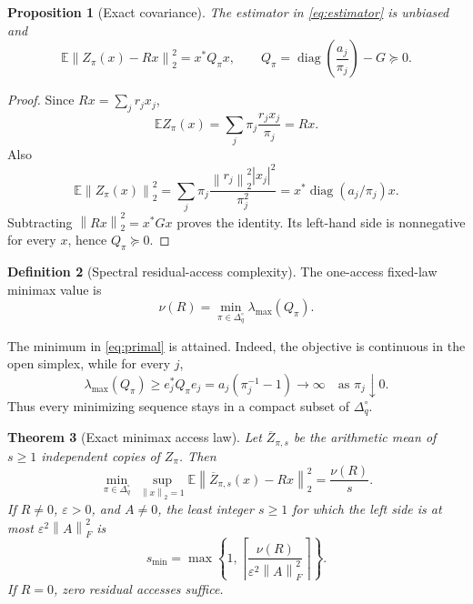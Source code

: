\documentclass[11pt]{article}
\newtheorem{theorem}{Theorem}[section]
\newtheorem{proposition}[theorem]{Proposition}
\theoremstyle{definition}
\newtheorem{definition}[theorem]{Definition}
\newcommand{\diag}{\operatorname{diag}}
\newcommand{\E}{\mathbb E}
\newcommand{\norm}[1]{\left\lVert #1\right\rVert}
\begin{document}
\begin{proposition}[Exact covariance]
\label{prop:covariance}
The estimator in \eqref{eq:estimator} is unbiased and
\begin{equation}
  \E\norm{Z_\pi(x)-Rx}_2^2=x^*Q_\pi x,
  \qquad
  Q_\pi=\diag\!\left(\frac{a_j}{\pi_j}\right)-G\succeq0.
  \label{eq:covariance}
\end{equation}
\end{proposition}

\begin{proof}
Since $Rx=\sum_jr_jx_j$,
\[
  \E Z_\pi(x)=\sum_j\pi_j\frac{r_jx_j}{\pi_j}=Rx.
\]
Also
\[
  \E\norm{Z_\pi(x)}_2^2
  =\sum_j\pi_j\frac{\norm{r_j}_2^2|x_j|^2}{\pi_j^2}
  =x^*\diag(a_j/\pi_j)x.
\]
Subtracting $\norm{Rx}_2^2=x^*Gx$ proves the identity.  Its left-hand side is nonnegative for
every $x$, hence $Q_\pi\succeq0$.
\end{proof}

\begin{definition}[Spectral residual-access complexity]
\label{def:nu}
The one-access fixed-law minimax value is
\begin{equation}
  \nu(R)=\min_{\pi\in\Delta_q^\circ}\lambda_{\max}(Q_\pi).
  \label{eq:primal}
\end{equation}
\end{definition}

The minimum in \eqref{eq:primal} is attained.  Indeed, the objective is continuous in the open
simplex, while for every $j$,
\[
  \lambda_{\max}(Q_\pi)\ge e_j^*Q_\pi e_j
  =a_j(\pi_j^{-1}-1)\longrightarrow\infty
  \quad\text{as }\pi_j\downarrow0.
\]
Thus every minimizing sequence stays in a compact subset of $\Delta_q^\circ$.

\begin{theorem}[Exact minimax access law]
\label{thm:sample-complexity}
Let $\overline Z_{\pi,s}$ be the arithmetic mean of $s\ge1$ independent copies of
$Z_\pi$.  Then
\begin{equation}
  \min_{\pi\in\Delta_q^\circ}\ 
  \sup_{\norm{x}_2=1}
  \E\norm{\overline Z_{\pi,s}(x)-Rx}_2^2
  =\frac{\nu(R)}{s}.
  \label{eq:s-samples}
\end{equation}
If $R\ne0$, $\varepsilon>0$, and $A\ne0$, the least integer $s\ge1$ for which the left side is
at most $\varepsilon^2\norm{A}_F^2$ is
\begin{equation}
  s_{\min}=\max\left\{1,
  \left\lceil\frac{\nu(R)}{\varepsilon^2\norm{A}_F^2}\right\rceil\right\}.
  \label{eq:sample-count}
\end{equation}
If $R=0$, zero residual accesses suffice.
\end{theorem}
\end{document}
